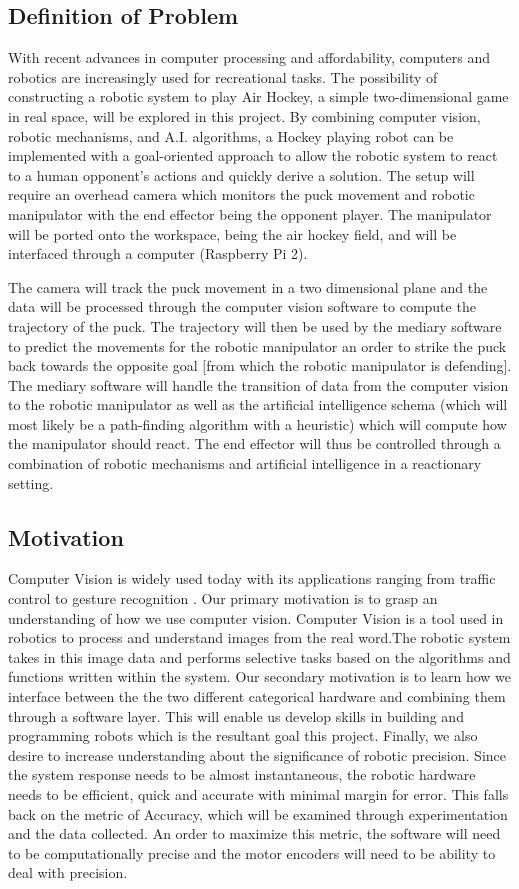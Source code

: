 \documentclass[letterpaper, 10 pt, conference]{ieeeconf}
\begin{document}
\subsection{Definition of Problem}
With recent advances in computer processing and affordability, computers and robotics are increasingly used for recreational tasks.  The possibility of constructing a robotic system to play Air Hockey, a simple two-dimensional game in real space, will be explored in this project. By combining computer vision, robotic mechanisms, and A.I. algorithms, a Hockey playing robot can be implemented with a goal-oriented approach to allow the robotic system to react to a human opponent’s actions and quickly derive a solution. The setup will require an overhead camera which monitors the puck movement and robotic manipulator with the end effector being the opponent player. The manipulator will be ported onto the workspace, being the air hockey field, and will be interfaced through a computer (Raspberry Pi 2). 

The camera will track the puck movement in a two dimensional plane and the data will be processed through the computer vision software to compute the trajectory of the puck.  The trajectory will then be used by the mediary software to predict the movements for the robotic manipulator an order to strike the puck back towards the opposite goal [from which the robotic manipulator is defending].  The mediary software will handle the transition of data from the computer vision to the robotic manipulator as well as the artificial intelligence schema (which will most likely be a path-finding algorithm with a heuristic) which will compute how the manipulator should react. The end effector will thus be controlled through a combination of robotic mechanisms and artificial intelligence in a reactionary setting.
\subsection{Motivation}
Computer Vision is widely used today with its applications ranging from traffic control\cite{aliane} to gesture recognition \cite{bhame}. Our primary motivation is to grasp an understanding of how we use computer vision. Computer Vision is a tool used in robotics to process and understand images from the real word.The robotic system takes in this image data and performs selective tasks based on the algorithms and functions written within the system. Our secondary motivation is to learn how we interface between the the two different categorical hardware and combining them through a software layer. This will enable us develop skills in building and programming robots which is the resultant goal this project. Finally, we also desire to increase understanding about the  significance of robotic precision. Since the system response needs to be almost instantaneous, the robotic hardware needs to be efficient, quick and accurate with minimal margin for error. This falls back on the metric of Accuracy, which will be examined through experimentation and the data collected.  An order to maximize this metric, the software will need to be computationally precise and the motor encoders will need to be ability to deal with precision.
\end{document}
